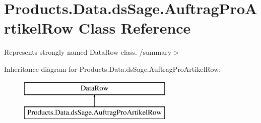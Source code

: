 \hypertarget{class_products_1_1_data_1_1ds_sage_1_1_auftrag_pro_artikel_row}{}\section{Products.\+Data.\+ds\+Sage.\+Auftrag\+Pro\+Artikel\+Row Class Reference}
\label{class_products_1_1_data_1_1ds_sage_1_1_auftrag_pro_artikel_row}


Represents strongly named Data\+Row class. /summary$>$  


Inheritance diagram for Products.\+Data.\+ds\+Sage.\+Auftrag\+Pro\+Artikel\+Row\+:\begin{figure}[H]
\begin{center}
\leavevmode
\includegraphics[height=2.000000cm]{class_products_1_1_data_1_1ds_sage_1_1_auftrag_pro_artikel_row}
\end{center}
\end{figure}
